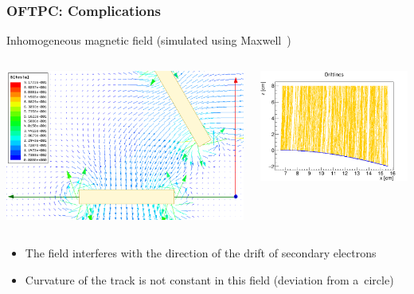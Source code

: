 \documentclass{beamer}
\begin{document}
	\begin{frame}
		\frametitle{OFTPC: Complications}
		Inhomogeneous magnetic field (simulated using Maxwell~\cite{maxwell})
		\begin{columns}
				\centering
				\begin{minipage}[t][4cm]{\textwidth}
					\centering
					\vspace{0.4cm}
					\includegraphics[width = 0.95 \textwidth]{../images/maxwell_zoom.png}
				\end{minipage}
				\centering
				\begin{minipage}[t][4cm]{\textwidth}
					\centering
					\includegraphics[width = 0.95 \textwidth]{../images/drift_xz.png}
				\end{minipage}
		\end{columns}
		\begin{itemize}
			\item The field interferes with the direction of the drift of secondary electrons
			\item Curvature of the track is not constant in this field (deviation from a~circle)
		\end{itemize}
	\end{frame}
	
\end{document}
